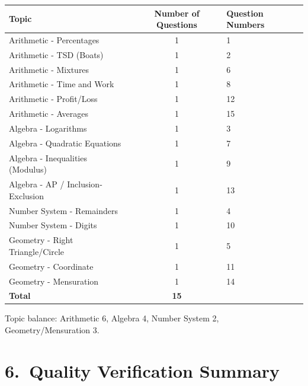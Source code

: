 \documentclass[11pt]{article}
\begin{document}
\begin{center}
\begin{tabular}{|l|c|l|}
\hline
\textbf{Topic} & \textbf{Number of Questions} & \textbf{Question Numbers} \\
\hline
Arithmetic - Percentages         & 1 & 1 \\ \hline
Arithmetic - TSD (Boats)         & 1 & 2 \\ \hline
Arithmetic - Mixtures            & 1 & 6 \\ \hline
Arithmetic - Time and Work       & 1 & 8 \\ \hline
Arithmetic - Profit/Loss         & 1 & 12 \\ \hline
Arithmetic - Averages            & 1 & 15 \\ \hline
Algebra - Logarithms             & 1 & 3 \\ \hline
Algebra - Quadratic Equations    & 1 & 7 \\ \hline
Algebra - Inequalities (Modulus) & 1 & 9 \\ \hline
Algebra - AP / Inclusion-Exclusion & 1 & 13 \\ \hline
Number System - Remainders       & 1 & 4 \\ \hline
Number System - Digits           & 1 & 10 \\ \hline
Geometry - Right Triangle/Circle & 1 & 5 \\ \hline
Geometry - Coordinate            & 1 & 11 \\ \hline
Geometry - Mensuration           & 1 & 14 \\ \hline
\textbf{Total} & \textbf{15} & \\ \hline
\end{tabular}
\end{center}

Topic balance: Arithmetic 6, Algebra 4, Number System 2, Geometry/Mensuration 3.

\section*{6.\ Quality Verification Summary}
\end{document}
